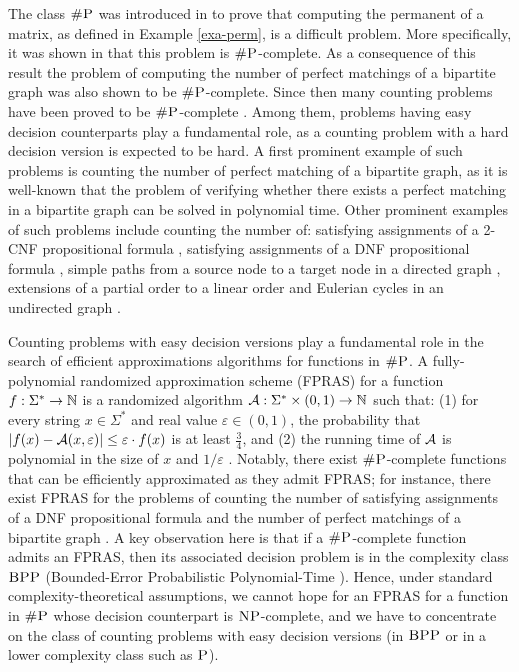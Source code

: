 
The class $\text{\sc \#P}$ was introduced in \cite{Valiant79} to prove that computing the permanent of a matrix, as defined in Example \ref{exa-perm}, is a difficult problem. More specifically, it was shown in  \cite{Valiant79}  that this problem is $\text{\sc \#P}$-complete. As a consequence of this result the problem of computing the number of perfect matchings of a bipartite graph was also shown to be $\text{\sc \#P}$-complete. Since then  many counting problems have been proved to be $\text{\sc \#P}$-complete \cite{V79b,PB83,P86,L86,BW91,HMRS98,BW05,DS12, PS13,PS14}. Among them, problems having easy decision counterparts play a fundamental role, as a counting problem with a hard decision version is expected to be hard. A first prominent example of such problems is counting the number of perfect matching of a bipartite graph, as it is well-known that the problem of verifying whether there exists a perfect matching in a bipartite graph can be solved in polynomial time. Other prominent examples of such problems include counting the number of: satisfying assignments of a 2-CNF propositional formula \cite{V79b}, satisfying assignments of a DNF propositional formula \cite{DHK05}, simple paths from a source node to a target node in a directed graph \cite{V79b}, extensions of a partial order to a linear order \cite{BW91} and Eulerian cycles in an undirected graph \cite{BW05}. 

Counting problems with easy decision versions play a fundamental role in the search of efficient approximations algorithms for functions in $\text{\sc \#P}$. A fully-polynomial randomized approximation scheme (FPRAS) for a function $f : \Sigma^* \to \mathbb{N}$ is a randomized algorithm ${\cal A} : \Sigma^* \times (0,1) \to \bbN$ such that: (1) for every string $x \in \Sigma^*$ and real value $\varepsilon \in (0,1)$, the probability that $|f(x) - {\cal A}(x,\varepsilon)| \leq \varepsilon \cdot f(x)$ is at least $\frac{3}{4}$, and (2) the running time of ${\cal A}$ is polynomial in the size of $x$ and $1/\varepsilon$ \cite{KL83}. Notably, there exist $\text{\sc \#P}$-complete functions that can be efficiently approximated as they admit FPRAS; for instance, there exist FPRAS for the problems of counting the number of satisfying assignments of a DNF propositional formula \cite{KL83} and the number of perfect matchings of a bipartite graph \cite{JSV04}. A key observation here is that if a $\text{\sc \#P}$-complete function admits an FPRAS, then its associated decision problem is in the complexity class $\text{\sc BPP}$ (Bounded-Error Probabilistic Polynomial-Time \cite{G77}). Hence, under standard complexity-theoretical assumptions, we cannot hope for an FPRAS for a function in $\text{\sc \#P}$ whose decision counterpart is $\text{\sc NP}$-complete, and we have to concentrate on the class of counting problems with easy decision versions (in $\text{\sc BPP}$ or in a lower complexity class such as $\text{\sc P}$). 

